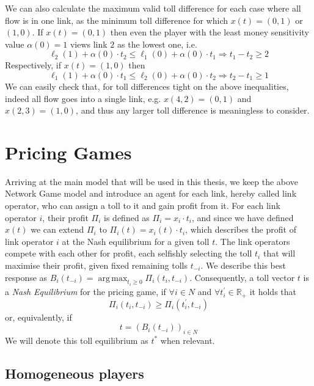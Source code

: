 \documentclass[10pt,a4paper]{book}
\newcommand{\R}{\mathbb{R}}
\DeclareMathOperator*{\argmax}{arg\,max}
\theoremstyle{definition}
\theoremstyle{comment}
\begin{document}
We can also calculate the maximum valid toll difference for each case where all flow is in one link, as the minimum toll difference for which $x(t) = (0, 1)$ or $(1, 0)$.
If $x(t) = (0, 1)$ then even the player with the least money sensitivity value $\alpha(0) = 1$ views link $2$ as the lowest one, i.e.
\[
\ell_2(1) + \alpha(0) \cdot t_2 \le \ell_1(0) + \alpha(0) \cdot t_1 \Rightarrow t_1 - t_2 \ge 2
\]
Respectively, if $x(t) = (1, 0)$ then
\[
\ell_1(1) + \alpha(0) \cdot t_1 \le \ell_2(0) + \alpha(0) \cdot t_2 \Rightarrow t_2 - t_1 \ge 1
\]
We can easily check that, for toll differences tight on the above inequalities, indeed all flow goes into a single link, e.g. $x(4, 2) = (0, 1)$ and $x(2, 3) = (1, 0)$, and thus any larger toll difference is meaningless to consider.

\section*{Pricing Games}

Arriving at the main model that will be used in this thesis, we keep the above Network Game model and introduce an agent for each link, hereby called link operator, who can assign a toll to it and gain profit from it.
For each link operator $i$, their profit $\Pi_i$ is defined as $\Pi_i = x_i \cdot t_i$, and since we have defined $x(t)$ we can extend $\Pi_i$ to $\Pi_i(t) = x_i(t) \cdot t_i$, which describes the profit of link operator $i$ at the Nash equilibrium for a given toll $t$.
The link operators compete with each other for profit, each selfishly selecting the toll $t_i$ that will maximise their profit, given fixed remaining tolls $t_{-i}$.
We describe this best response as $B_i(t_{-i}) = \argmax_{t_i \geq 0} \Pi_i(t_i, t_{-i})$.
Consequently, a toll vector $t$ is a \textit{Nash Equilibrium} for the pricing game, if $\forall i \in N$ and $\forall t_i^\prime \in \R_+$ it holds that
\[\Pi_i(t_i, t_{-i}) \geq \Pi_i(t_i^\prime, t_{-i})\]
or, equivalently, if
\[t = (B_i(t_{-i}))_{i \in N}\]
We will denote this toll equilibrium as $t^*$ when relevant.

\subsection*{Homogeneous players}
\end{document}

